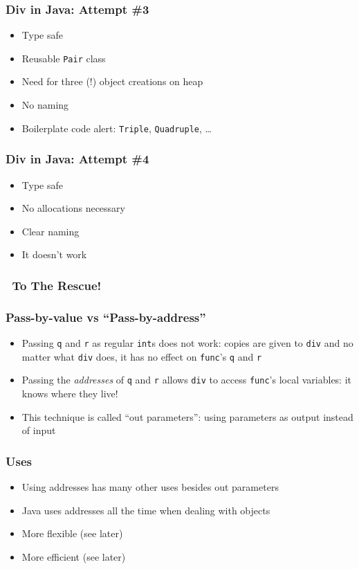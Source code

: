 \documentclass{../ucll-slides}
\newenvironment{procontralist}{
  \begingroup
  \newcommand{\pro}{\item[\Checkmark]}
  \newcommand{\con}{\item[\XSolidBrush]}
  \begin{itemize}
  }{
  \end{itemize}
  \endgroup}
\begin{document}
\begin{frame}
  \frametitle{Div in Java: Attempt \#3}
  \begin{procontralist}
    \pro<2-> Type safe
    \pro<2-> Reusable {\tt Pair} class
    \con<2-> Need for three (!) object creations on heap
    \con<2-> No naming
    \con<2-> Boilerplate code alert: {\tt Triple}, {\tt Quadruple}, \dots
  \end{procontralist}
\end{frame}

\begin{frame}
  \frametitle{Div in Java: Attempt \#4}
  \begin{procontralist}
    \pro<2-> Type safe
    \pro<2-> No allocations necessary
    \pro<2-> Clear naming
    \con<2-> It doesn't work \frownie
  \end{procontralist}
\end{frame}

\begin{frame}
  \frametitle{\cpp\ To The Rescue!}
\end{frame}

\begin{frame}
  \frametitle{Pass-by-value vs ``Pass-by-address''}
  \begin{itemize}
    \item Passing {\tt q} and {\tt r} as regular {\tt int}s does not work:
          copies are given to {\tt div} and no matter what {\tt div} does,
          it has no effect on {\tt func}'s {\tt q} and {\tt r}
    \item Passing the \emph{addresses} of {\tt q} and {\tt r}
          allows {\tt div} to access {\tt func}'s local variables:
          it knows where they live!
    \item This technique is called ``out parameters'': using parameters as output instead of input
  \end{itemize}
\end{frame}

\begin{frame}
  \frametitle{Uses}
  \begin{itemize}
    \item Using addresses has many other uses besides out parameters
    \item Java uses addresses all the time when dealing with objects
    \item More flexible (see later)
    \item More efficient (see later)
  \end{itemize}
\end{frame}


\end{document}
